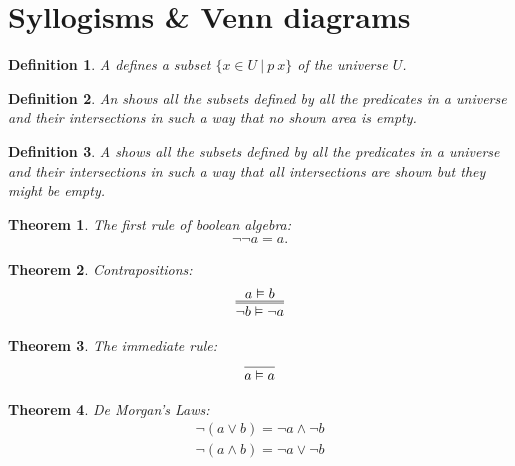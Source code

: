 \documentclass{article}
\theoremstyle{sltheorem}
\newtheorem{definition}{Definition}
\newtheorem{theorem}{Theorem}
\begin{document}
\section{Syllogisms \& Venn diagrams}
\begin{definition}
    A  defines a subset $\{x\in U\:|\:p\:x\}$ of the universe $U$.
\end{definition}
\begin{definition}
    An  shows all the subsets defined by all the predicates in a universe and their intersections in such a way that no shown area is empty.
\end{definition}
\begin{definition}
    A  shows all the subsets defined by all the predicates in a universe and their intersections in such a way that all intersections are shown but they might be empty.
\end{definition}
\begin{theorem}
    The first rule of boolean algebra:
    \begin{gather*}
        \neg\neg a = a.
    \end{gather*}
\end{theorem}
\begin{theorem}
    Contrapositions:
    \begin{gather*}
        \infer={\neg b\vDash\neg a}{a\vDash b}
    \end{gather*}
\end{theorem}
\begin{theorem}
    The immediate rule:
    \begin{gather*}
        \infer{a\vDash a}{}
    \end{gather*}
\end{theorem}
\begin{theorem}
    De Morgan's Laws:
    \begin{gather*}
        \neg(a\vee b) = \neg a \wedge \neg b\\
        \neg(a\wedge b) = \neg a \vee \neg b
    \end{gather*}
\end{theorem}
\end{document}
